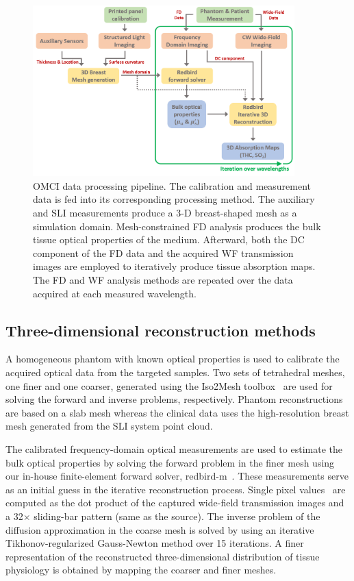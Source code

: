 \begin{figure}[]
\centering
\includegraphics[width=0.90\textwidth]{fig/omci/OMCIWorkflow_280720.png}
\caption{\ac{OMCI} data processing pipeline. The calibration and measurement data is fed into its corresponding processing method. The auxiliary and \ac{SLI} measurements produce a 3-D breast-shaped mesh as a simulation domain. Mesh-constrained \ac{FD} analysis produces the bulk tissue optical properties of the medium. Afterward, both the \ac{DC} component of the \ac{FD} data and the acquired \ac{WF} transmission images are employed to iteratively produce tissue absorption maps. The \ac{FD} and \ac{WF} analysis methods are repeated over the data acquired at each measured wavelength.}
\label{fig:DataAnalysis}
\end{figure}


\subsection{Three-dimensional reconstruction methods}
\label{Sec:FDanalysis}
A homogeneous phantom with known optical properties is used to calibrate the acquired optical data from the targeted samples. Two sets of tetrahedral meshes, one finer and one coarser, generated using the Iso2Mesh toolbox~\cite{Fang2009} are used for solving the forward and inverse problems, respectively. Phantom reconstructions are based on a slab mesh whereas the clinical data uses the high-resolution breast mesh generated from the \ac{SLI} system point cloud.

The calibrated frequency-domain optical measurements are used to estimate the bulk optical properties by solving the forward problem in the finer mesh using our in-house finite-element forward solver, redbird-m~\cite{Redbird2008}. These measurements serve as an initial guess in the iterative reconstruction process. Single pixel values~\cite{Yao2015} are computed as the dot product of the captured wide-field transmission images and a 32$\times$ sliding-bar pattern (same as the source). The inverse problem of the diffusion approximation in the coarse mesh is solved by using an iterative Tikhonov-regularized Gauss-Newton method over 15 iterations. A finer representation of the reconstructed three-dimensional distribution of tissue physiology is obtained by mapping the coarser and finer meshes.



